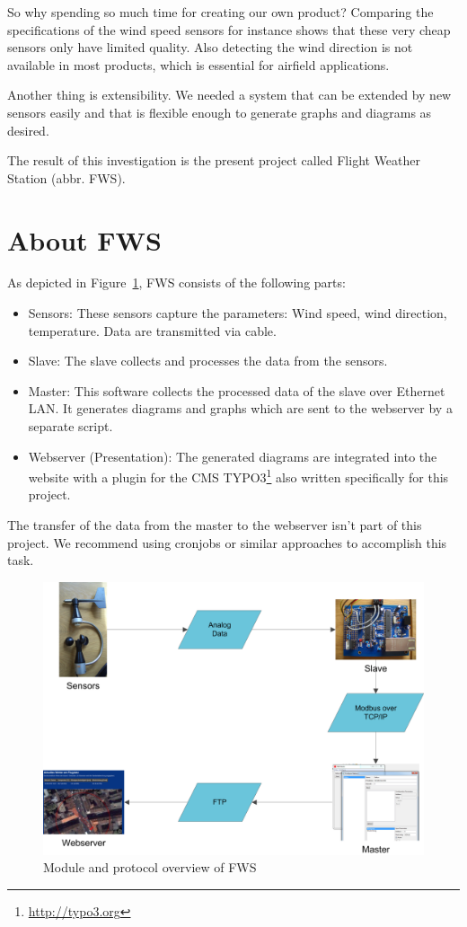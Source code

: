 So why spending so much time for creating our own product? Comparing the specifications of the wind speed sensors for instance shows that these very cheap sensors only have limited quality. Also detecting the wind direction is not available in most products, which is essential for airfield applications.

Another thing is extensibility. We needed a system that can be extended by new sensors easily and that is flexible enough to generate graphs and diagrams as desired.

The result of this investigation is the present project called Flight Weather Station (abbr. FWS).

\section{About FWS} %
\label{sec:about_fws}

As depicted in Figure~\ref{fig:fws_overview}, FWS consists of the following parts:
\begin{itemize}
\item Sensors: These sensors capture the parameters: Wind speed, wind direction, temperature. Data are transmitted via cable.
\item Slave: The slave collects and processes the data from the sensors.
\item Master: This software collects the processed data of the slave over Ethernet LAN. It generates diagrams and graphs which are sent to the webserver by a separate script.
\item Webserver (Presentation): The generated diagrams are integrated into the website with a plugin for the CMS TYPO3\footnote{\url{http://typo3.org}} also written specifically for this project.
\end{itemize}

The transfer of the data from the master to the webserver isn't part of this project. We recommend using cronjobs or similar approaches to accomplish this task.

\begin{figure}[ht]
    \centering
    \includegraphics[width=\linewidth]{graphics/overview.png}
    \caption{Module and protocol overview of FWS}
    \label{fig:fws_overview}
\end{figure}

